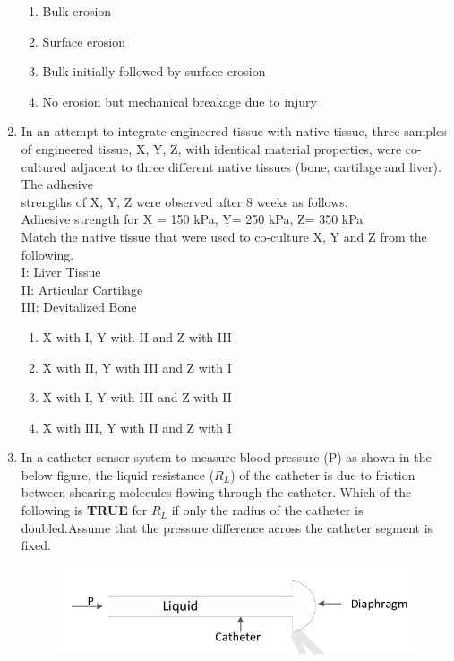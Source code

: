 \documentclass[a4paper,12pt]{exam}
\numberwithin{equation}{enumi}
\numberwithin{figure}{enumi}
\begin{document}
\begin{enumerate}
\begin{enumerate}
\item Bulk erosion
\item Surface erosion
\item Bulk initially followed by surface erosion
\item No erosion but mechanical breakage due to injury
\end{enumerate}  

\item In an attempt to integrate engineered tissue with native tissue, three samples of  engineered tissue, X, Y, Z, with identical material properties, were co-cultured adjacent to three different native tissues (bone, cartilage and liver). The adhesive \\ strengths of X, Y, Z were observed after 8 weeks as follows. \\[8pt] 
 Adhesive strength for X = 150 kPa, Y= 250 kPa, Z= 350 kPa \\[8pt]   Match the native tissue that were used to co-culture X, Y and Z from the following. \\[8pt]  I: Liver Tissue \\[8pt]  II: Articular Cartilage \\[8pt] III: Devitalized Bone

\hfill{}

\begin{enumerate}
\item X with I,  Y with II and Z with III  
\item X with II,  Y with III and Z with I 
\item X with I,  Y with III and Z with II 
\item X with III,  Y with II and Z with I  
\end{enumerate}  

\item In a catheter-sensor system to measure blood pressure (P) as shown in the below figure, the liquid resistance ($R_L$) of the catheter is due to friction between shearing molecules flowing through the catheter. Which of the following is \textbf{TRUE} for $R_L$ if only the radius  of the catheter is doubled.Assume that the pressure difference across the catheter 
segment is fixed.

\begin{figure}[H]
\centering
\includegraphics[width=0.6\columnwidth]{figs/Q43.png}
\label{fig:Q43.png}
\end{figure}


\end{enumerate}
\end{document}
